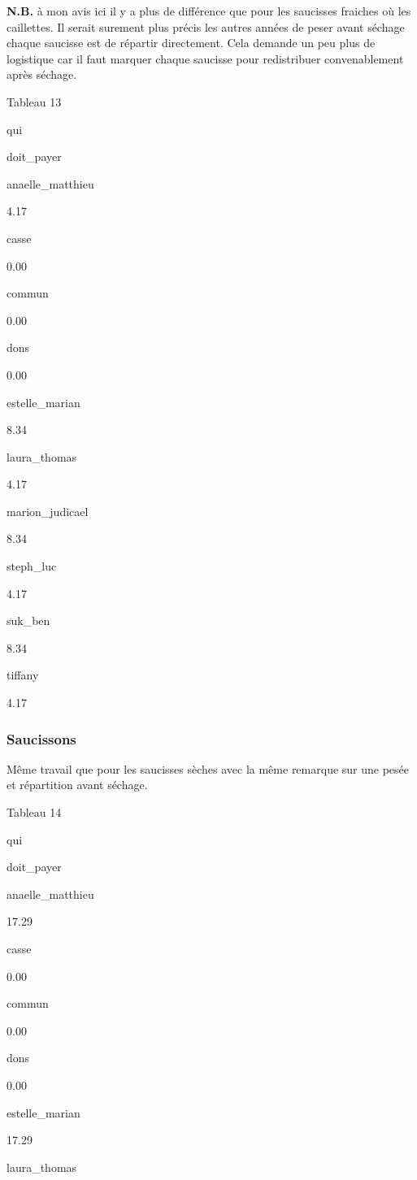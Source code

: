 \documentclass[]{article}
\begin{document}
\textbf{N.B.} à mon avis ici il y a plus de différence que pour les
saucisses fraiches où les caillettes. Il serait surement plus précis les
autres années de peser avant séchage chaque saucisse est de répartir
directement. Cela demande un peu plus de logistique car il faut marquer
chaque saucisse pour redistribuer convenablement après séchage.

Tableau 13

qui

doit\_payer

anaelle\_matthieu

4.17

casse

0.00

commun

0.00

dons

0.00

estelle\_marian

8.34

laura\_thomas

4.17

marion\_judicael

8.34

steph\_luc

4.17

suk\_ben

8.34

tiffany

4.17

\hypertarget{saucissons}{%
\subsubsection{Saucissons}\label{saucissons}}

Même travail que pour les saucisses sèches avec la même remarque sur une
pesée et répartition avant séchage.

Tableau 14

qui

doit\_payer

anaelle\_matthieu

17.29

casse

0.00

commun

0.00

dons

0.00

estelle\_marian

17.29

laura\_thomas
\end{document}
